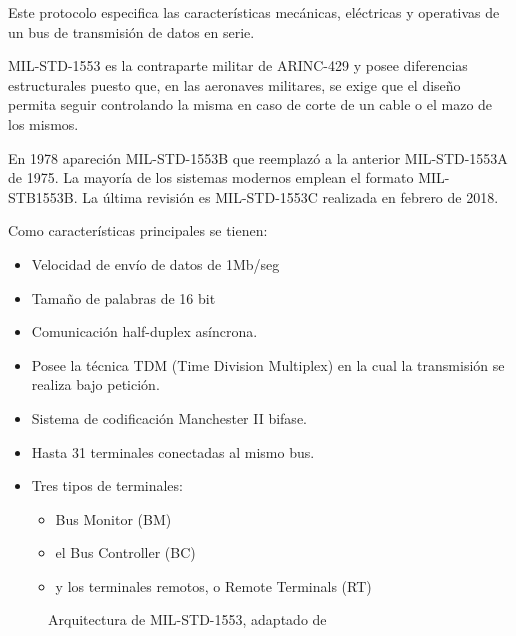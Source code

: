 Este protocolo especifica las características mecánicas, eléctricas y operativas de un bus de transmisión de datos en serie. 

 MIL-STD-1553 es la contraparte militar de ARINC-429 y posee diferencias estructurales puesto que, en las
aeronaves militares, se exige que el diseño permita seguir controlando la misma en caso de corte de un cable o  el  mazo de los mismos.

En 1978 apareción  MIL-STD-1553B que reemplazó a la anterior  MIL-STD-1553A de 1975. 
La mayoría de los sistemas modernos emplean el formato MIL-STB1553B.
La última revisión es MIL-STD-1553C realizada en febrero de 2018. 


Como características principales se tienen:

\begin{itemize}
\item Velocidad de envío de datos de 1Mb/seg
\item Tamaño de palabras de 16 bit
\item Comunicación half-duplex asíncrona.
\item Posee la técnica TDM (Time Division Multiplex) en la cual la transmisión se realiza bajo petición.
\item Sistema de codificación Manchester II bifase.
\item Hasta 31 terminales conectadas al mismo bus.
\item Tres tipos de terminales:
  \begin{itemize}
  \item Bus Monitor (BM)
  \item el Bus Controller (BC)
  \item y los terminales remotos, o Remote Terminals (RT)
  \end{itemize}
\end{itemize}

\begin{figure}[!h]
  \centering

  \caption{Arquitectura de MIL-STD-1553, adaptado de \protect\cite{MIL-1553-tutorial}}
  \label{fig:01.MIL.1553.componentes}
\end{figure}



